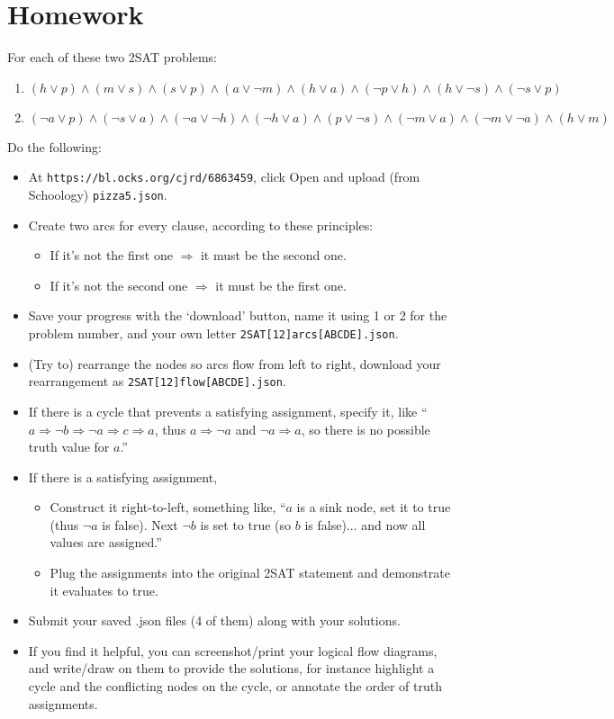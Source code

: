 \documentclass[12pt]{article}
\begin{document}
\clearpage
\section*{Homework}
For each of these two 2SAT problems:
\begin{enumerate}
\item
$(h \lor p) \land (m \lor s) \land (s \lor p) \land (a \lor \neg m)
  \land (h \lor a) \land (\neg p \lor h) \land (h \lor \neg s) \land
  (\neg s \lor p)$
\item
$(\neg a \lor p) \land (\neg s \lor a) \land (\neg a \lor \neg h) \land
  (\neg h \lor a) \land (p \lor \neg s) \land (\neg m \lor a) \land (\neg
  m \lor \neg a) \land (h \lor m)$
\end{enumerate}

Do the following:
\begin{itemize}
\item At {\tt https://bl.ocks.org/cjrd/6863459}, click Open and upload (from
  Schoology) {\tt pizza5.json}.
\item Create two arcs for every clause, according to these principles:
  \begin{itemize}
  \item If it's not the first one $\Rightarrow$ it must be the second one.
  \item If it's not the second one $\Rightarrow$ it must be the first one.
  \end{itemize}
\item Save your progress with the `download' button, name it using 1 or 2 for
  the problem number, and your own letter {\tt 2SAT[12]arcs[ABCDE].json}.
\item (Try to) rearrange the nodes so arcs flow from left to right, download
  your rearrangement as {\tt 2SAT[12]flow[ABCDE].json}.
\item If there is a cycle that prevents a satisfying assignment, specify it,
  like ``$a \Rightarrow \neg b \Rightarrow \neg a \Rightarrow c \Rightarrow a$,
  thus $a\Rightarrow\neg a$ and $\neg a\Rightarrow a$, so there is no possible
  truth value for $a$.''
\item If there is a satisfying assignment,
  \begin{itemize}
    \item Construct it right-to-left, something like, ``$a$ is a sink node, set
      it to {\sc true} (thus $\neg a$ is {\sc false}). Next $\neg b$ is set to
      {\sc true} (so $b$ is {\sc false})... and now all values are assigned.''
    \item Plug the assignments into the original 2SAT statement and demonstrate
      it evaluates to {\sc true}.
  \end{itemize}

\item Submit your saved .json files (4 of them) along with your solutions.
\item If you find it helpful, you can screenshot/print your logical flow
  diagrams, and write/draw on them to provide the solutions, for instance
  highlight a cycle and the conflicting nodes on the cycle, or annotate the
  order of truth assignments.
\end{itemize}
\end{document}

